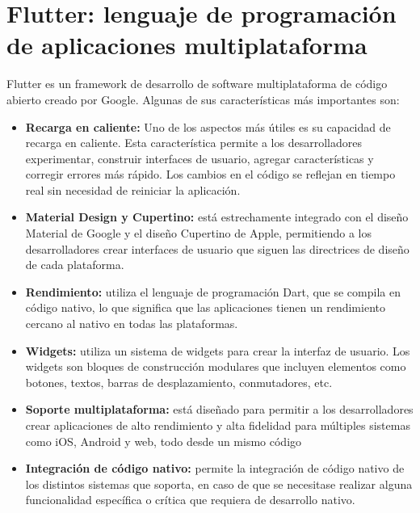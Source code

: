 \section{Flutter: lenguaje de programación de aplicaciones multiplataforma}
Flutter \cite{wiki:flutter} es un framework de desarrollo de software multiplataforma de código abierto creado por Google. Algunas de sus características más importantes son:
\begin{itemize}
    \item \textbf{Recarga en caliente:} Uno de los aspectos más útiles es su capacidad de recarga en caliente. Esta característica permite a los desarrolladores experimentar, construir interfaces de usuario, agregar características y corregir errores más rápido. Los cambios en el código se reflejan en tiempo real sin necesidad de reiniciar la aplicación. 
    \item \textbf{Material Design y Cupertino:} está estrechamente integrado con el diseño Material de Google y el diseño Cupertino de Apple, permitiendo a los desarrolladores crear interfaces de usuario que siguen las directrices de diseño de cada plataforma.   
    \item \textbf{Rendimiento:} utiliza el lenguaje de programación Dart, que se compila en código nativo, lo que significa que las aplicaciones tienen un rendimiento cercano al nativo en todas las plataformas.    
    \item \textbf{Widgets:} utiliza un sistema de widgets para crear la interfaz de usuario. Los widgets son bloques de construcción modulares que incluyen elementos como botones, textos, barras de desplazamiento, conmutadores, etc.  
    \item \textbf{Soporte multiplataforma:} está diseñado para permitir a los desarrolladores crear aplicaciones de alto rendimiento y alta fidelidad para múltiples sistemas como iOS, Android y web, todo desde un mismo código
    \item \textbf{Integración de código nativo:} permite la integración de código nativo de los distintos sistemas que soporta, en caso de que se necesitase realizar alguna funcionalidad específica o crítica que requiera de desarrollo nativo. 
\end{itemize}
